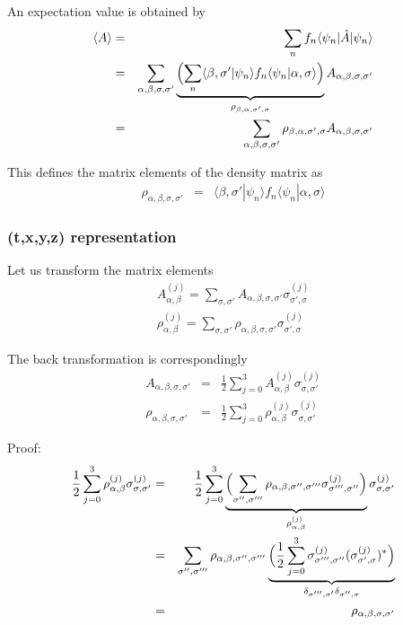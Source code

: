 \documentclass[11pt,a4paper]{report}
\begin{document}
An expectation value is obtained by
\begin{eqnarray}
\langle A\rangle
&=&\sum_nf_n\langle\psi_n|\hat{A}|\psi_n\rangle
\nonumber\\
&=&
\sum_{\alpha,\beta,\sigma,\sigma'}
\underbrace{
\Bigl(\sum_n
\langle\beta,\sigma'|\psi_n\rangle f_n\langle\psi_n|\alpha,\sigma\rangle\Bigr)
}_{\rho_{\beta,\alpha,\sigma',\sigma}}
A_{\alpha,\beta,\sigma,\sigma'} 
\nonumber\\
&=&
\sum_{\alpha,\beta,\sigma,\sigma'}
\rho_{\beta,\alpha,\sigma',\sigma}
A_{\alpha,\beta,\sigma,\sigma'} 
\end{eqnarray}

This defines the matrix elements of the density matrix as
\begin{eqnarray}
\rho_{\alpha,\beta,\sigma,\sigma'}&=&
\langle\beta,\sigma'|\psi_n\rangle f_n\langle\psi_n|\alpha,\sigma\rangle
\end{eqnarray}

\subsubsection{(t,x,y,z) representation}
Let us transform the matrix elements 
\begin{eqnarray}
A^{(j)}_{\alpha,\beta}=\sum_{\sigma,\sigma'} 
A_{\alpha,\beta,\sigma,\sigma'} \sigma^{(j)}_{\sigma',\sigma}
\nonumber\\
\rho^{(j)}_{\alpha,\beta}=\sum_{\sigma,\sigma'} 
\rho_{\alpha,\beta,\sigma,\sigma'} \sigma^{(j)}_{\sigma',\sigma}
\end{eqnarray}

The back transformation is correspondingly
\begin{eqnarray}
A_{\alpha,\beta,\sigma,\sigma'}
&=&\frac{1}{2}\sum_{j=0}^3A^{(j)}_{\alpha,\beta}
\sigma^{(j)}_{\sigma,\sigma'}
\nonumber\\
\rho_{\alpha,\beta,\sigma,\sigma'}
&=&\frac{1}{2}\sum_{j=0}^3\rho^{(j)}_{\alpha,\beta}
\sigma^{(j)}_{\sigma,\sigma'}
\end{eqnarray}

Proof:
\begin{eqnarray}
\frac{1}{2}\sum_{j=0}^3\rho^{(j)}_{\alpha,\beta}
\sigma^{(j)}_{\sigma,\sigma'}
&=&
\frac{1}{2}\sum_{j=0}^3
\underbrace{\Bigl(\sum_{\sigma'',\sigma'''} 
\rho_{\alpha,\beta,\sigma'',\sigma'''} \sigma^{(j)}_{\sigma''',\sigma''}
\Bigr)}_{\rho^{(j)}_{\alpha,\beta}}
\sigma^{(j)}_{\sigma,\sigma'}
\nonumber\\
&=&
\sum_{\sigma'',\sigma'''} 
\rho_{\alpha,\beta,\sigma'',\sigma'''} 
\underbrace{\Bigl(
\frac{1}{2}\sum_{j=0}^3
\sigma^{(j)}_{\sigma''',\sigma''}
(\sigma^{(j)}_{\sigma',\sigma})^*
\Bigr)}_{\delta_{\sigma''',\sigma'}\delta_{\sigma'',\sigma}}
\nonumber\\
&=&
\rho_{\alpha,\beta,\sigma,\sigma'} 
\end{eqnarray}
\end{document}
